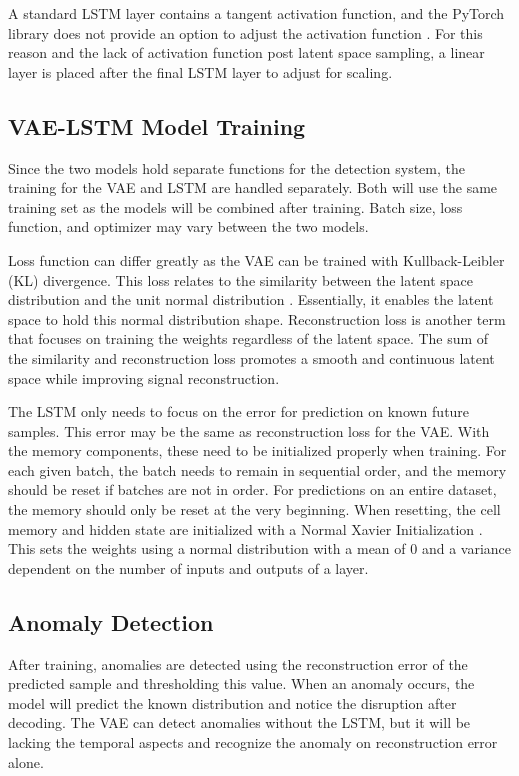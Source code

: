 \documentclass[conference]{IEEEtran}
\begin{document}
A standard LSTM layer contains a tangent activation function, and the PyTorch library does not provide an option to adjust the activation function \cite{lstm_pytorch}. For this reason and the lack of activation function post latent space sampling, a linear layer is placed after the final LSTM layer to adjust for scaling.

\subsection{VAE-LSTM Model Training}
Since the two models hold separate functions for the detection system, the training for the VAE and LSTM are handled separately. Both will use the same training set as the models will be combined after training. Batch size, loss function, and optimizer may vary between the two models.

Loss function can differ greatly as the VAE can be trained with Kullback-Leibler (KL) divergence. This loss relates to the similarity between the latent space distribution and the unit normal distribution \cite{vae_page}. Essentially, it enables the latent space to hold this normal distribution shape. Reconstruction loss is another term that focuses on training the weights regardless of the latent space. The sum of the similarity and reconstruction loss promotes a smooth and continuous latent space while improving signal reconstruction.

The LSTM only needs to focus on the error for prediction on known future samples. This error may be the same as reconstruction loss for the VAE. With the memory components, these need to be initialized properly when training. For each given batch, the batch needs to remain in sequential order, and the memory should be reset if batches are not in order. For predictions on an entire dataset, the memory should only be reset at the very beginning. When resetting, the cell memory and hidden state are initialized with a Normal Xavier Initialization \cite{xavier}. This sets the weights using a normal distribution with a mean of 0 and a variance dependent on the number of inputs and outputs of a layer.

\subsection{Anomaly Detection}
After training, anomalies are detected using the reconstruction error of the predicted sample and thresholding this value. When an anomaly occurs, the model will predict the known distribution and notice the disruption after decoding. The VAE can detect anomalies without the LSTM, but it will be lacking the temporal aspects and recognize the anomaly on reconstruction error alone.
\end{document}
